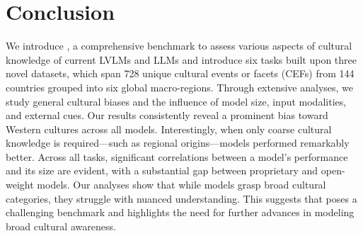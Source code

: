 \section{Conclusion}
\label{sec:conclusion}
%
We introduce \dsname, a comprehensive benchmark to assess various aspects of cultural knowledge of current LVLMs and LLMs and introduce six tasks built upon three novel datasets, which span 728 unique cultural events or facets (CEFs) from 144 countries grouped into six global macro-regions.
%
Through extensive analyses, we study general cultural biases and the influence of model size, input modalities, and external cues.
%
Our results consistently reveal a prominent bias toward Western cultures across all models.
%
Interestingly, when only coarse cultural knowledge is required---such as regional origins---models performed remarkably better.
%
Across all tasks, significant correlations between a model's performance and its size are evident, with a substantial gap between proprietary and open-weight models.
%
Our analyses show that while models grasp broad cultural categories, they struggle with nuanced understanding.
%
This suggests that \dsname poses a challenging benchmark and highlights the need for further advances in modeling broad cultural awareness.
%
